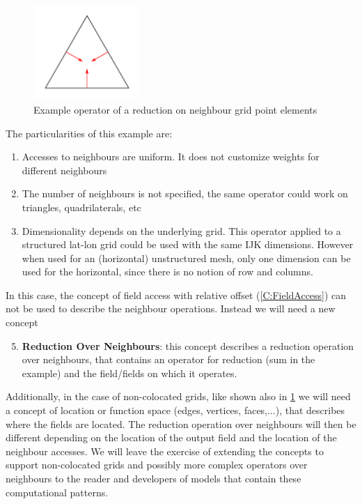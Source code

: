 \documentclass[a4paper,10pt]{scrartcl}
\begin{document}
\begin{figure}[htp!]
	\includegraphics[width=4cm]{./on_edges.png}
	\caption{Example operator of a reduction on neighbour grid point elements}
	\label{fig:on_edges}
\end{figure}

The particularities of this example are:
\begin{enumerate}
	\item Accesses to neighbours are uniform. It does not customize weights for different neighbours
	\item The number of neighbours is not specified, the same operator could work on triangles, quadrilaterals, etc
	\item Dimensionality depends on the underlying grid. This operator applied to a structured lat-lon grid could
	be used with the same IJK dimensions. However when used for an (horizontal) unstructured mesh, only one dimension
	can be used for the horizontal, since there is no notion of row and columns.
\end{enumerate}

In this case, the concept of field access with relative offset (\cref{C:FieldAccess}) can
not be used to describe the neighbour operations. Instead we will need a new concept

\begin{enumerate}[label=\textbf{C.\arabic*}]
	  \setcounter{enumi}{4}
	\item \textbf{Reduction Over Neighbours}: this concept describes a reduction operation over neighbours,
	that contains an operator for reduction (sum in the example) and the field/fields on which it operates.
\end{enumerate}

Additionally, in the case of non-colocated grids, like shown also in \cref{fig:on_edges} we will need a concept
of location or function space (edges, vertices, faces,...), 
that describes where the fields are located. The reduction operation over neighbours will then be different
depending on the location of the output field and the location of the neighbour accesses.  
We will leave the exercise of extending the concepts to support non-colocated grids and 
possibly more complex operators over neighbours to the reader and developers of models that
contain these computational patterns. 
\end{document}
